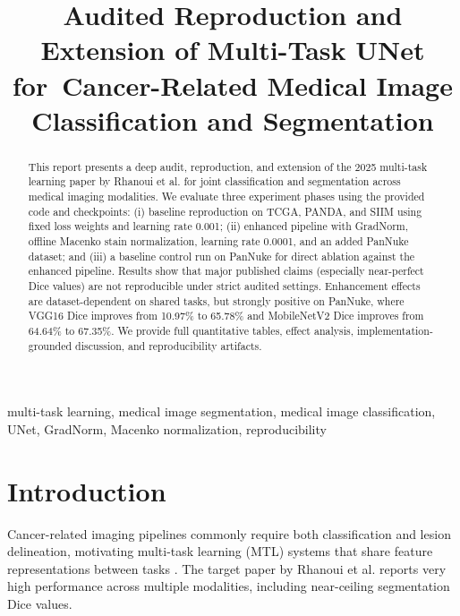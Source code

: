 \documentclass[conference]{IEEEtran}
\begin{document}
\title{Audited Reproduction and Extension of Multi-Task UNet for\
Cancer-Related Medical Image Classification and Segmentation}

\author{
}

\maketitle

\begin{abstract}
This report presents a deep audit, reproduction, and extension of the 2025 multi-task learning paper by Rhanoui et al. for joint classification and segmentation across medical imaging modalities. We evaluate three experiment phases using the provided code and checkpoints: (i) baseline reproduction on TCGA, PANDA, and SIIM using fixed loss weights and learning rate 0.001; (ii) enhanced pipeline with GradNorm, offline Macenko stain normalization, learning rate 0.0001, and an added PanNuke dataset; and (iii) a baseline control run on PanNuke for direct ablation against the enhanced pipeline. Results show that major published claims (especially near-perfect Dice values) are not reproducible under strict audited settings. Enhancement effects are dataset-dependent on shared tasks, but strongly positive on PanNuke, where VGG16 Dice improves from 10.97\% to 65.78\% and MobileNetV2 Dice improves from 64.64\% to 67.35\%. We provide full quantitative tables, effect analysis, implementation-grounded discussion, and reproducibility artifacts.
\end{abstract}

\begin{IEEEkeywords}
multi-task learning, medical image segmentation, medical image classification, UNet, GradNorm, Macenko normalization, reproducibility
\end{IEEEkeywords}

\section{Introduction}
Cancer-related imaging pipelines commonly require both classification and lesion delineation, motivating multi-task learning (MTL) systems that share feature representations between tasks \cite{b1,b2}. The target paper by Rhanoui et al. \cite{b3} reports very high performance across multiple modalities, including near-ceiling segmentation Dice values. 
\end{document}

